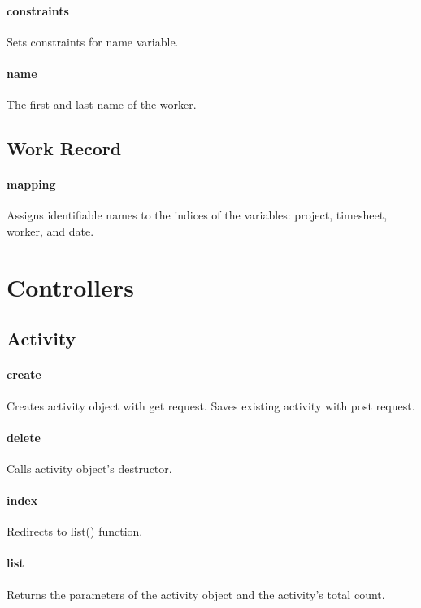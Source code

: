 \documentclass[12pt]{article}
\begin{document}
\paragraph{constraints} Sets constraints for name variable.
\paragraph{name} The first and last name of the worker.

\setcounter{paragraph}{0}
\subsection{Work Record}\label{sec:DWork Record}
\paragraph{mapping} Assigns identifiable names to the indices of the variables: project, timesheet, worker, and date.

\section{Controllers}\label{sec:Controllers}

\subsection{Activity}\label{sec:CActivity}
\paragraph{create} Creates activity object with get request. Saves existing activity with post request.
\paragraph{delete} Calls activity object's destructor.
\paragraph{index} Redirects to list() function.
\paragraph{list} Returns the parameters of the activity object and the activity's total count.
\end{document}

